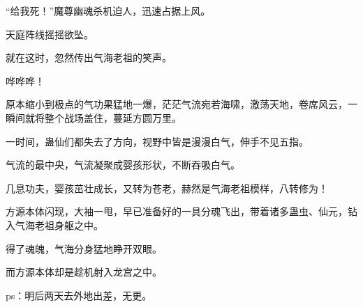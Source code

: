 \begin{this_body}
“给我死！”魔尊幽魂杀机迫人，迅速占据上风。

天庭阵线摇摇欲坠。

就在这时，忽然传出气海老祖的笑声。

哗哗哗！

原本缩小到极点的气功果猛地一爆，茫茫气流宛若海啸，激荡天地，卷席风云，一瞬间就将整个战场盖住，蔓延方圆万里。

一时间，蛊仙们都失去了方向，视野中皆是漫漫白气，伸手不见五指。

气流的最中央，气流凝聚成婴孩形状，不断吞吸白气。

几息功夫，婴孩茁壮成长，又转为苍老，赫然是气海老祖模样，八转修为！

方源本体闪现，大袖一甩，早已准备好的一具分魂飞出，带着诸多蛊虫、仙元，钻入气海老祖身躯之中。

得了魂魄，气海分身猛地睁开双眼。

而方源本体却是趁机射入龙宫之中。

ps：明后两天去外地出差，无更。

\end{this_body}

